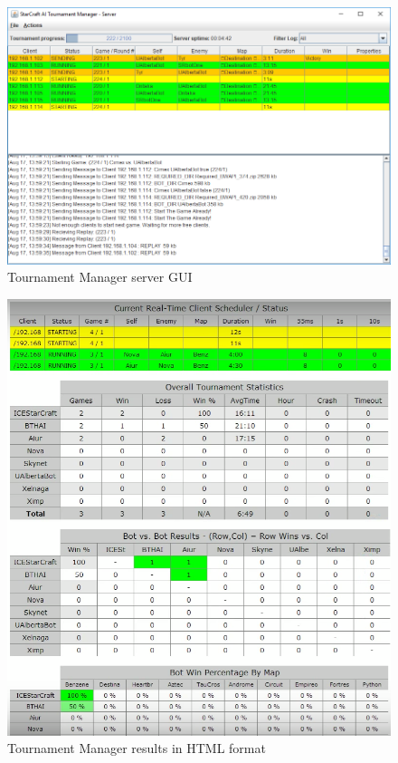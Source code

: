 \begin{figure}[h]
  \centering
  \includegraphics[width=1\columnwidth]{fig/tournament-manager-screenshot.png}
  \caption{Tournament Manager server GUI}
  \label{tmServerGUI}
\end{figure}

\begin{figure}[h]
  \centering
  \includegraphics[width=1\columnwidth]{fig/tournament-manager-screenshot2.png}
  \caption{Tournament Manager results in HTML format}
  \label{tmServerHTML}
\end{figure}

